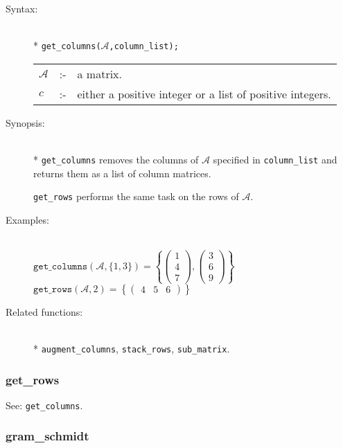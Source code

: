 \begin{description}
\item[Syntax:]\mbox{}\\*
\texttt{get\_columns($\mathcal{A}$,column\_list);}\\[2mm]
\begin{tabular}{l l l}
$\mathcal{A}$ &:-& a matrix. \\
$c$          &:-& either a positive integer or a list of positive
                integers.
\end{tabular}

\item[Synopsis:]\mbox{}\\*
\texttt{get\_columns} removes the columns of $\mathcal{A}$ specified in
                \texttt{column\_list} and returns them as a list of column
                matrices.

 \texttt{get\_rows} performs the same task on the rows of
                $\mathcal{A}$.

\item[Examples:]\mbox{}\\
  \(\texttt{get\_columns}(\mathcal{A},\{1,3\})  =
  \left\{
  \begin{pmatrix} 1 \\ 4 \\ 7 \end{pmatrix},
  \begin{pmatrix} 3 \\ 6 \\ 9 \end{pmatrix}
  \right\}\) \\[2mm]
  \(\texttt{get\_rows}(\mathcal{A},2)  =
  \left\{
  \begin{pmatrix} 4 & 5 & 6 \end{pmatrix}
  \right\}\)

\item[Related functions:]\mbox{}\\*
\texttt{augment\_columns}, \texttt{stack\_rows}, \texttt{sub\_matrix}.
\end{description}


\subsubsection{get\_rows}
\label{linalg:get_rows}
See: \texttt{get\_columns}.


\subsubsection{gram\_schmidt}
\label{linalg:gram_schmidt}

